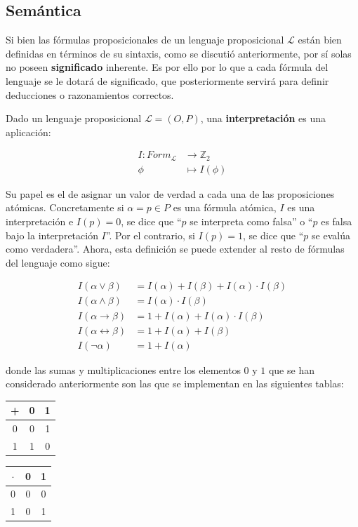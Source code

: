 \subsection{Semántica}\label{subsection:lpropsemantic}
Si bien las fórmulas proposicionales de un lenguaje proposicional $\mathcal{L}$ están bien definidas en términos de su sintaxis, como se discutió anteriormente, por sí solas no poseen \textbf{significado} inherente. Es por ello por lo que a cada fórmula del lenguaje se le dotará de significado, que posteriormente servirá para definir deducciones o razonamientos correctos.

Dado un lenguaje proposicional $\mathcal{L} = (O,P)$, una \textbf{interpretación} es una aplicación:

\begin{align*}
    I : Form_{\mathcal{L}} &\to \mathbb{Z}_2 \\\nonumber
    \phi &\mapsto I(\phi)
\end{align*}

Su papel es el de asignar un valor de verdad a cada una de las proposiciones atómicas. Concretamente si $\alpha = p \in P$ es una fórmula atómica, $I$ es una interpretación e $I(p) = 0$, se dice que ``$p$ se interpreta como falsa'' o ``$p$ es falsa bajo la interpretación $I$''. Por el contrario, si $I(p) = 1$, se dice que ``$p$ se evalúa como verdadera''. Ahora, esta definición se puede extender al resto de fórmulas del lenguaje como sigue:



\begin{align*}
    I(\alpha \lor \beta) &= I(\alpha) + I(\beta) + I(\alpha) \cdot I(\beta) \\
    I(\alpha \land \beta) &= I(\alpha) \cdot I(\beta) \\
    I(\alpha \rightarrow \beta) &= 1 + I(\alpha) + I(\alpha) \cdot I(\beta) \\
    I(\alpha \leftrightarrow \beta) &= 1 + I(\alpha) + I(\beta) \\
    I(\neg \alpha) &= 1 + I(\alpha)
\end{align*}

donde las sumas y multiplicaciones entre los elementos $0$ y $1$ que se han considerado anteriormente son las que se implementan en las siguientes tablas:

\vspace{0.2cm}

\begin{minipage}{.5\linewidth}
\centering
\begin{tabular}{c|cc}
+ & 0 & 1 \\
\hline
0 & 0 & 1 \\
1 & 1 & 0 \\
\end{tabular}
\end{minipage}%
\begin{minipage}{.5\linewidth}
\centering
\begin{tabular}{c|cc}
$\cdot$ & 0 & 1 \\
\hline
0 & 0 & 0 \\
1 & 0 & 1 \\
\end{tabular}
\end{minipage}

